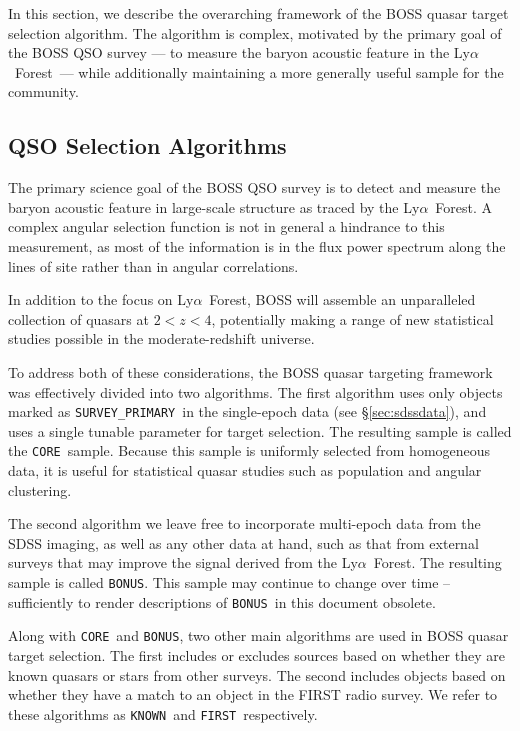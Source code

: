\documentclass[12pt,preprint]{aastex}
\newcommand{\Lyaf}{Ly$\alpha$~Forest}
\newcommand{\core}{\texttt{CORE}}
\newcommand{\bonus}{\texttt{BONUS}}
\newcommand{\primary}{\texttt{SURVEY\_PRIMARY}}
\newcommand{\known}{\texttt{KNOWN}}
\newcommand{\first}{\texttt{FIRST}}
\begin{document}
In this section, we describe the overarching framework of the BOSS
quasar target selection algorithm. The algorithm is complex, motivated
by the primary goal of the BOSS QSO survey --- to measure the baryon
acoustic feature in the \Lyaf\ --- while additionally maintaining a more
generally useful sample for the community.

\subsection{QSO Selection Algorithms}

The primary science goal of the BOSS QSO survey is to detect and measure
the baryon acoustic feature in large-scale structure as traced by
the \Lyaf. A complex angular selection function is not in general a
hindrance to this measurement, as most of the information is in the
flux power spectrum along the lines of site rather than in angular
correlations.

In addition to the focus on \Lyaf, BOSS will assemble an unparalleled
collection of quasars at $2 < z < 4$, potentially making a range of new
statistical studies possible in the moderate-redshift universe.

To address both of these considerations, the BOSS quasar targeting
framework was effectively divided into two algorithms. The first
algorithm uses only objects marked as \primary\ in the single-epoch
data (see \S \ref{sec:sdssdata}), and uses a single tunable parameter
for target selection. The resulting sample is called the \core\ sample.
Because this sample is uniformly selected from homogeneous data, it is
useful for statistical quasar studies such as population and angular
clustering.

The second algorithm we leave free to incorporate multi-epoch data from 
the SDSS imaging, as well as any other data at hand, such as that
from external surveys that may improve the signal derived from
the \Lyaf.  The resulting sample is called \bonus.  This sample
may continue to change over time -- sufficiently to render 
descriptions of \bonus\ in this document obsolete.

Along with \core\ and \bonus, two other main algorithms are used in BOSS
quasar target selection. The first includes or excludes sources based on
whether they are known quasars or stars from other surveys. The second
includes objects based on whether they have a match to an object in the
FIRST radio survey. We refer to these algorithms as \known\ and \first\
respectively.  
\end{document}
